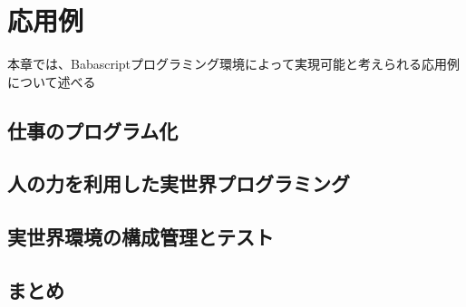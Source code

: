 \chapter{応用例}
\label{chap:application}

本章では、Babascriptプログラミング環境によって実現可能と考えられる応用例について述べる

\section{仕事のプログラム化}\label{ux4ed5ux4e8bux306eux30d7ux30edux30b0ux30e9ux30e0ux5316}

\section{人の力を利用した実世界プログラミング}\label{ux4ebaux306eux529bux3092ux5229ux7528ux3057ux305fux5b9fux4e16ux754cux30d7ux30edux30b0ux30e9ux30dfux30f3ux30b0}

\section{実世界環境の構成管理とテスト}\label{ux5b9fux4e16ux754cux74b0ux5883ux306eux69cbux6210ux7ba1ux7406ux3068ux30c6ux30b9ux30c8}

\section{まとめ}\label{ux307eux3068ux3081}
